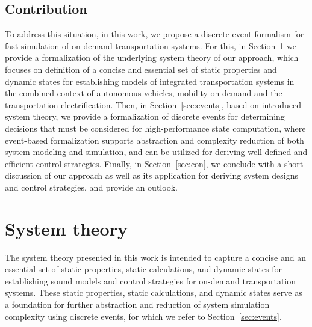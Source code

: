 \documentclass[graybox]{svmult}
\begin{document}
\subsection{Contribution}
To address this situation, in this work, we propose a discrete-event formalism for fast simulation of on-demand transportation systems.
For this, in Section~\ref{sec:theory} we provide a formalization of the underlying system theory of our approach, which focuses on definition of a concise and essential set of static properties and dynamic states for establishing models of integrated transportation systems in the combined context of autonomous vehicles, mobility-on-demand and the transportation electrification.
Then, in Section~\ref{sec:events}, based on introduced system theory, we provide a formalization of discrete events for determining decisions that must be considered for high-performance state computation, where event-based formalization supports abstraction and complexity reduction of both system modeling and simulation, and can be utilized for deriving well-defined and efficient control strategies. 
Finally, in Section~\ref{sec:con}, we conclude with a short discussion of our approach as well as its application for deriving system designs and control strategies, and provide an outlook.

\section{System theory}
\label{sec:theory}

The system theory presented in this work is intended to capture a concise and an essential set of static properties, static calculations, and dynamic states for establishing sound models and control strategies for on-demand transportation systems.
These static properties, static calculations, and dynamic states serve as a foundation for further abstraction and reduction of system simulation complexity using discrete events, for which we refer to Section~\ref{sec:events}.
\end{document}
